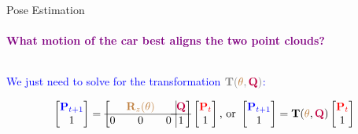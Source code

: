 \documentclass[aspectratio=169]{beamer}
\begin{document}
\begin{frame}{Pose Estimation}
	\framesubtitle{\textcolor{purple}{What motion of the car best aligns the two point clouds?}}
		
    \begin{columns}
        \begin{column}[c]{0.5\textwidth}
            
        \end{column}
        \begin{column}[c]{0.5\textwidth}
			\vspace{0.4in}
            
        \end{column}
    \end{columns}

	\vspace{0.1in}

	\begin{block}{\textcolor{blue}{We just need to solve for the transformation $\textcolor{gray}{\mathbf{T}(\textcolor{brown}{\theta}, \textcolor{purple}{\mathbf{Q}})}$:}}

	\begin{equation*}
        \begin{bmatrix}
            \color{blue}{ \mathbf{P}_{t+1}} \\ 1
        \end{bmatrix}
        =
        \left[
            \begin{matrix}
                  & \color{brown}{\mathbf{R}_z(\theta)} &   \\ \hline
                0 & 0 & 0 \\
            \end{matrix} \right.
            \left.
            \vline
            \begin{matrix}
                \color{purple}{\mathbf{Q}} \\ \hline
                1
            \end{matrix} \right]
        \begin{bmatrix}
            \color{red}{\mathbf{P}_{t}} \\
            1
        \end{bmatrix}
		\text{, or }
		\begin{bmatrix}
            \color{blue}{ \mathbf{P}_{t+1}} \\ 1
        \end{bmatrix}
        =
        \mathbf{T}(\textcolor{brown}{\theta}, \textcolor{purple}{\mathbf{Q}})
        \begin{bmatrix}
            \color{red}{\mathbf{P}_{t}} \\
            1
        \end{bmatrix}
    \end{equation*}
\end{block}
\end{frame}
\end{document}
